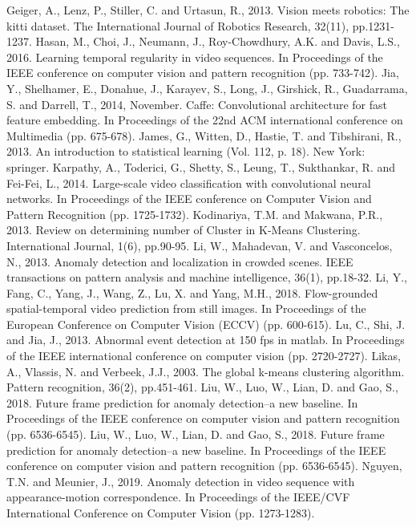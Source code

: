 \documentclass[sigplan,authorversion,nonacm, 9pt]{acmart}
\begin{document}
\begin{thebibliography}{00}
 Geiger, A., Lenz, P., Stiller, C. and Urtasun, R., 2013. Vision meets robotics: The kitti dataset. The International Journal of Robotics Research, 32(11), pp.1231-1237.
 Hasan, M., Choi, J., Neumann, J., Roy-Chowdhury, A.K. and Davis, L.S., 2016. Learning temporal regularity in video sequences. In Proceedings of the IEEE conference on computer vision and pattern recognition (pp. 733-742).
 Jia, Y., Shelhamer, E., Donahue, J., Karayev, S., Long, J., Girshick, R., Guadarrama, S. and Darrell, T., 2014, November. Caffe: Convolutional architecture for fast feature embedding. In Proceedings of the 22nd ACM international conference on Multimedia (pp. 675-678).
 James, G., Witten, D., Hastie, T. and Tibshirani, R., 2013. An introduction to statistical learning (Vol. 112, p. 18). New York: springer.
 Karpathy, A., Toderici, G., Shetty, S., Leung, T., Sukthankar, R. and Fei-Fei, L., 2014. Large-scale video classification with convolutional neural networks. In Proceedings of the IEEE conference on Computer Vision and Pattern Recognition (pp. 1725-1732).
 Kodinariya, T.M. and Makwana, P.R., 2013. Review on determining number of Cluster in K-Means Clustering. International Journal, 1(6), pp.90-95.
 Li, W., Mahadevan, V. and Vasconcelos, N., 2013. Anomaly detection and localization in crowded scenes. IEEE transactions on pattern analysis and machine intelligence, 36(1), pp.18-32.
 Li, Y., Fang, C., Yang, J., Wang, Z., Lu, X. and Yang, M.H., 2018. Flow-grounded spatial-temporal video prediction from still images. In Proceedings of the European Conference on Computer Vision (ECCV) (pp. 600-615).
 Lu, C., Shi, J. and Jia, J., 2013. Abnormal event detection at 150 fps in matlab. In Proceedings of the IEEE international conference on computer vision (pp. 2720-2727).
 Likas, A., Vlassis, N. and Verbeek, J.J., 2003. The global k-means clustering algorithm. Pattern recognition, 36(2), pp.451-461.
 Liu, W., Luo, W., Lian, D. and Gao, S., 2018. Future frame prediction for anomaly detection–a new baseline. In Proceedings of the IEEE conference on computer vision and pattern recognition (pp. 6536-6545).
 Liu, W., Luo, W., Lian, D. and Gao, S., 2018. Future frame prediction for anomaly detection–a new baseline. In Proceedings of the IEEE conference on computer vision and pattern recognition (pp. 6536-6545).
 Nguyen, T.N. and Meunier, J., 2019. Anomaly detection in video sequence with appearance-motion correspondence. In Proceedings of the IEEE/CVF International Conference on Computer Vision (pp. 1273-1283).

\end{thebibliography}
\end{document}
